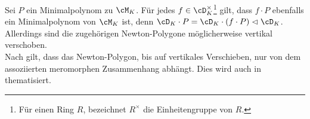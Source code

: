 \begin{comment}
\begin{bem}
Zur vorstellung der Eigenschaft Regulär \dots
\begin{itemize}
\item $P_1=x(x\partial_x+1)$ regulär mit Lösung $\frac{1}{x}$
\item $P_2=x^2\partial_x+1$ irrregulär mit Lösung $e^{\frac{1}{x}}$
\end{itemize}
\end{bem}
\end{comment}

\begin{bem} \label{bem:NPverschieben}
Sei $P$ ein Minimalpolynom zu $\cM_K$.
Für jedes $f\in\cD_K^\times$\footnote{
Für einen Ring $R$, bezeichnet $R^\times$ die Einheitengruppe von $R$.
} gilt, dass $f\cdot P$ ebenfalls ein Minimalpolynom von $\cM_K$ ist, denn
$\cD_K\cdot P=\cD_K\cdot (f\cdot P)\vartriangleleft \cD_K$.
Allerdings sind die zugehörigen Newton-Polygone möglicherweise vertikal
verschoben.\\
Nach \cite[Seite 25]{sabbah_cimpa90} gilt, dass das Newton-Polygon, bis auf
vertikales Verschieben, nur von dem assoziierten meromorphen Zusammenhang
abhängt.
Dies wird auch in \cite[Bem 5.4]{ZulaBarbara} thematisiert.
\end{bem}

